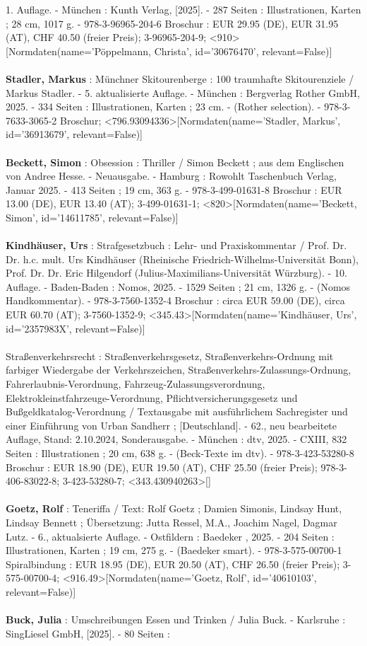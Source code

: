 \documentclass{article}
\begin{document}
\begin{multicols}{3}
1. Auflage. - München : Kunth Verlag, [2025]. - 287 Seiten : Illustrationen, Karten ; 28 cm, 1017 g. - 978-3-96965-204-6 Broschur : EUR 29.95 (DE), EUR 31.95 (AT), CHF 40.50 (freier Preis); 3-96965-204-9; <910>[Normdaten(name='Pöppelmann, Christa', id='30676470', relevant=False)]\\\\\textbf{Stadler, Markus} : Münchner Skitourenberge : 100 traumhafte Skitourenziele / Markus Stadler. - 5. aktualisierte Auflage. - München : Bergverlag Rother GmbH, 2025. - 334 Seiten : Illustrationen, Karten ; 23 cm. - (Rother selection). - 978-3-7633-3065-2 Broschur; <796.93094336>[Normdaten(name='Stadler, Markus', id='36913679', relevant=False)]\\\\\textbf{Beckett, Simon} : Obsession : Thriller / Simon Beckett ; aus dem Englischen von Andree Hesse. - Neuausgabe. - Hamburg : Rowohlt Taschenbuch Verlag, Januar 2025. - 413 Seiten ; 19 cm, 363 g. - 978-3-499-01631-8 Broschur : EUR 13.00 (DE), EUR 13.40 (AT); 3-499-01631-1; <820>[Normdaten(name='Beckett, Simon', id='14611785', relevant=False)]\\\\\textbf{Kindhäuser, Urs} : Strafgesetzbuch : Lehr- und Praxiskommentar / Prof. Dr. Dr. h.c. mult. Urs Kindhäuser (Rheinische Friedrich-Wilhelms-Universität Bonn), Prof. Dr. Dr. Eric Hilgendorf (Julius-Maximilians-Universität Würzburg). - 10. Auflage. - Baden-Baden : Nomos, 2025. - 1529 Seiten ; 21 cm, 1326 g. - (Nomos Handkommentar). - 978-3-7560-1352-4 Broschur : circa EUR 59.00 (DE), circa EUR 60.70 (AT); 3-7560-1352-9; <345.43>[Normdaten(name='Kindhäuser, Urs', id='2357983X', relevant=False)]\\\\Straßenverkehrsrecht : Straßenverkehrsgesetz, Straßenverkehrs-Ordnung mit farbiger Wiedergabe der Verkehrszeichen, Straßenverkehrs-Zulassungs-Ordnung, Fahrerlaubnis-Verordnung, Fahrzeug-Zulassungsverordnung, Elektrokleinstfahrzeuge-Verordnung, Pflichtversicherungsgesetz und Bußgeldkatalog-Verordnung / Textausgabe mit ausführlichem Sachregister und einer Einführung von Urban Sandherr ; [Deutschland]. - 62., neu bearbeitete Auflage, Stand: 2.10.2024, Sonderausgabe. - München : dtv, 2025. - CXIII, 832 Seiten : Illustrationen ; 20 cm, 638 g. - (Beck-Texte im dtv). - 978-3-423-53280-8 Broschur : EUR 18.90 (DE), EUR 19.50 (AT), CHF 25.50 (freier Preis); 978-3-406-83022-8; 3-423-53280-7; <343.430940263>[]\\\\\textbf{Goetz, Rolf} : Teneriffa / Text: Rolf Goetz ; Damien Simonis, Lindsay Hunt, Lindsay Bennett ; Übersetzung: Jutta Ressel, M.A., Joachim Nagel, Dagmar Lutz. - 6., aktualsierte Auflage. - Ostfildern : Baedeker , 2025. - 204 Seiten : Illustrationen, Karten ; 19 cm, 275 g. - (Baedeker smart). - 978-3-575-00700-1 Spiralbindung : EUR 18.95 (DE), EUR 20.50 (AT), CHF 26.50 (freier Preis); 3-575-00700-4; <916.49>[Normdaten(name='Goetz, Rolf', id='40610103', relevant=False)]\\\\\textbf{Buck, Julia} : Umschreibungen Essen und Trinken / Julia Buck. - Karlsruhe : SingLiesel GmbH, [2025]. - 80 Seiten : 
\end{multicols}
\end{document}
